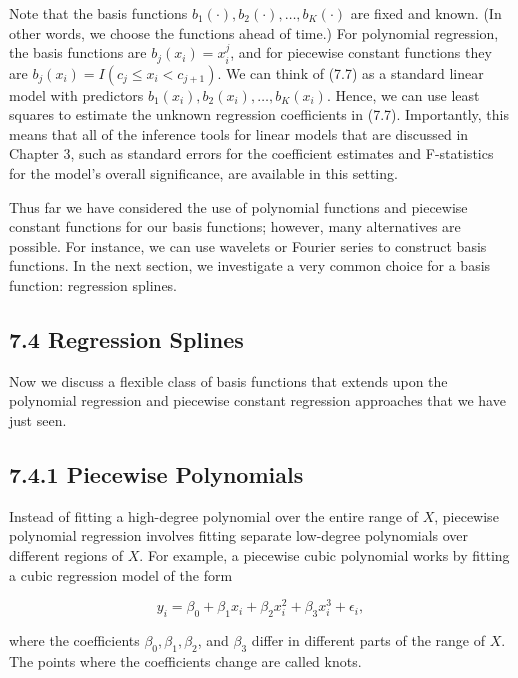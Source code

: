\documentclass[10pt]{article}
\begin{document}
Note that the basis functions $b_{1}(\cdot), b_{2}(\cdot), \ldots, b_{K}(\cdot)$ are fixed and known. (In other words, we choose the functions ahead of time.) For polynomial regression, the basis functions are $b_{j}\left(x_{i}\right)=x_{i}^{j}$, and for piecewise constant functions they are $b_{j}\left(x_{i}\right)=I\left(c_{j} \leq x_{i}<c_{j+1}\right)$. We can think of (7.7) as a standard linear model with predictors $b_{1}\left(x_{i}\right), b_{2}\left(x_{i}\right), \ldots, b_{K}\left(x_{i}\right)$. Hence, we can use least squares to estimate the unknown regression coefficients in (7.7). Importantly, this means that all of the inference tools for linear models that are discussed in Chapter 3, such as standard errors for the coefficient estimates and F-statistics for the model's overall significance, are available in this setting.

Thus far we have considered the use of polynomial functions and piecewise constant functions for our basis functions; however, many alternatives are possible. For instance, we can use wavelets or Fourier series to construct basis functions. In the next section, we investigate a very common choice for a basis function: regression splines.

\subsection*{7.4 Regression Splines}
Now we discuss a flexible class of basis functions that extends upon the polynomial regression and piecewise constant regression approaches that we have just seen.

\subsection*{7.4.1 Piecewise Polynomials}
Instead of fitting a high-degree polynomial over the entire range of $X$, piecewise polynomial regression involves fitting separate low-degree polynomials over different regions of $X$. For example, a piecewise cubic polynomial works by fitting a cubic regression model of the form


\begin{equation*}
y_{i}=\beta_{0}+\beta_{1} x_{i}+\beta_{2} x_{i}^{2}+\beta_{3} x_{i}^{3}+\epsilon_{i}, \tag{7.8}
\end{equation*}


where the coefficients $\beta_{0}, \beta_{1}, \beta_{2}$, and $\beta_{3}$ differ in different parts of the range of $X$. The points where the coefficients change are called knots.
\end{document}
